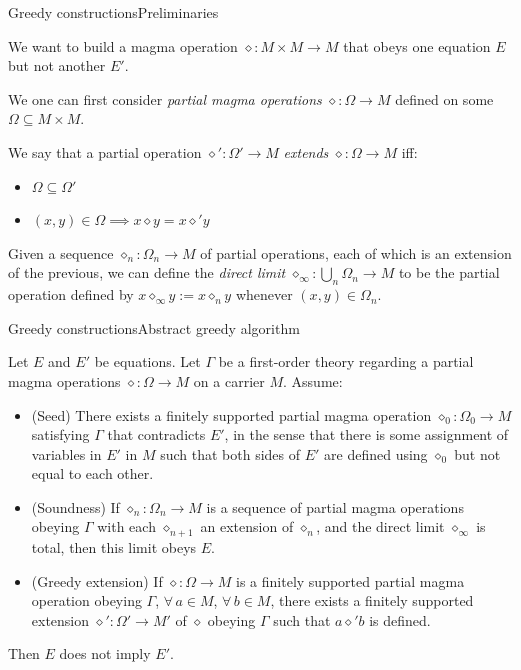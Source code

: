 \documentclass{beamer}
\newcommand{\op}{\diamond}
\begin{document}
\begin{frame}{Greedy constructions}{Preliminaries}

We want to build a magma operation $\op \colon M \times M \to M$ that obeys one equation $E$ but not another $E'$.

We one can first consider \emph{partial magma operations} $\op \colon \Omega \to M$ defined on some  $\Omega \subseteq M \times M$.

We say that a partial operation $\op' \colon \Omega' \to M$ \emph{extends} $\op \colon \Omega \to M$ iff:\!
\begin{itemize}
	\item $\Omega \subseteq \Omega'$
	\item $(x, y) \in \Omega \implies x \op y = x \op' y$
\end{itemize}

Given a sequence $\op_n \colon \Omega_n \to M$ of partial operations, each of which is an extension of the previous, we can define the \emph{direct limit} $\op_\infty \colon \bigcup_n \Omega_n \to M$ to be the partial operation defined by $x \op_\infty y := x \op_n y$ whenever $(x,y) \in \Omega_n$.

\end{frame}


\begin{frame}{Greedy constructions}{Abstract greedy algorithm}
	
Let $E$ and $E'$ be equations.
Let $\Gamma$ be a first-order theory regarding a partial magma operations $\op \colon \Omega \to M$ on a carrier $M$.
Assume:
\begin{itemize}
	\item (Seed) There exists a finitely supported partial magma operation $\op_0 \colon \Omega_0 \to M$ satisfying $\Gamma$ that contradicts $E'$, in the sense that there is some assignment of variables in $E'$ in $M$ such that both sides of $E'$ are defined using $\op_0$ but not equal to each other.
	\item (Soundness) If $\op_n \colon \Omega_n \to M$ is a sequence of partial magma operations obeying $\Gamma$ with each $\op_{n+1}$ an extension of $\op_n$, and the direct limit $\op_\infty$ is total, then this limit obeys $E$.
	\item (Greedy extension) If $\op \colon \Omega \to M$ is a finitely supported partial magma operation obeying $\Gamma$, $\forall\, a \in M$, $\forall\, b \in M$, there exists a finitely supported extension $\op' \colon \Omega' \to M'$ of $\op$ obeying $\Gamma$ such that $a \op' b$ is defined.
\end{itemize}
Then $E$ does not imply $E'$.
	
\end{frame}
\end{document}
